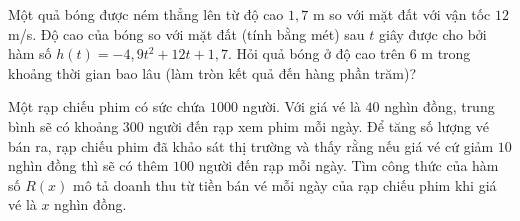\begin{bt}%
Một quả bóng được ném thẳng lên từ độ cao $1{,}7$ m so với mặt đất với vận tốc $12$ m/s. Độ cao của bóng so với mặt đất (tính bằng mét) sau $t$ giây được cho bởi hàm số $h(t)=-4{,}9t^2+12t+1{,}7$. Hỏi quả bóng ở độ cao trên $6$ m trong khoảng thời gian bao lâu (làm tròn kết quả đến hàng phần trăm)?
\end{bt}

\begin{bt}%
Một rạp chiếu phim có sức chứa $1000$ người. Với giá vé là $40$ nghìn đồng, trung bình sẽ có khoảng $300$ người đến rạp xem phim mỗi ngày. Để tăng số lượng vé bán ra, rạp chiếu phim đã khảo sát thị trường và thấy rằng nếu giá vé cứ giảm $10$ nghìn đồng thì sẽ có thêm $100$ người đến rạp mỗi ngày. Tìm công thức của hàm số $R(x)$ mô tả doanh thu từ tiền bán vé mỗi ngày của rạp chiếu phim khi giá vé là $x$ nghìn đồng.\\
\end{bt}

